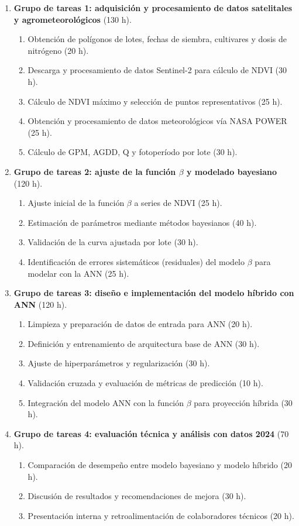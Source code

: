 \documentclass[
11pt, %
]{charter}
\begin{document}
\begin{enumerate}
\item \textbf{Grupo de tareas 1: adquisición y procesamiento de datos satelitales y agrometeorológicos} (130 h).
  \begin{enumerate} \item Obtención de polígonos de lotes, fechas de siembra, cultivares y dosis de nitrógeno (20 h).
	\item Descarga y procesamiento de datos Sentinel-2 para cálculo de NDVI (30 h).
	\item Cálculo de NDVI máximo y selección de puntos representativos (25 h).
	\item Obtención y procesamiento de datos meteorológicos vía NASA POWER (25 h).
	\item Cálculo de GPM, AGDD, Q y fotoperíodo por lote (30 h).
\end{enumerate}

\item \textbf{Grupo de tareas 2: ajuste de la función $\beta$ y modelado bayesiano} (120 h).
  \begin{enumerate} \item Ajuste inicial de la función $\beta$ a series de NDVI (25 h).
	\item Estimación de parámetros mediante métodos bayesianos (40 h).
	\item Validación de la curva ajustada por lote (30 h).
	\item Identificación de errores sistemáticos (residuales) del modelo $\beta$ para modelar con la ANN (25 h).
\end{enumerate}

\item \textbf{Grupo de tareas 3: diseño e implementación del modelo híbrido con ANN} (120 h).
  \begin{enumerate} \item Limpieza y preparación de datos de entrada para ANN (20 h).
	\item Definición y entrenamiento de arquitectura base de ANN (30 h).
	\item Ajuste de hiperparámetros y regularización (30 h).
	\item Validación cruzada y evaluación de métricas de predicción (10 h).
	\item Integración del modelo ANN con la función $\beta$ para proyección híbrida (30 h).
\end{enumerate}

\item \textbf{Grupo de tareas 4: evaluación técnica y análisis con datos 2024} (70 h).
  \begin{enumerate} \item Comparación de desempeño entre modelo bayesiano y modelo híbrido (20 h).
	\item Discusión de resultados y recomendaciones de mejora (30 h).
	\item Presentación interna y retroalimentación de colaboradores técnicos (20 h).
\end{enumerate}


\end{enumerate}
\end{document}
